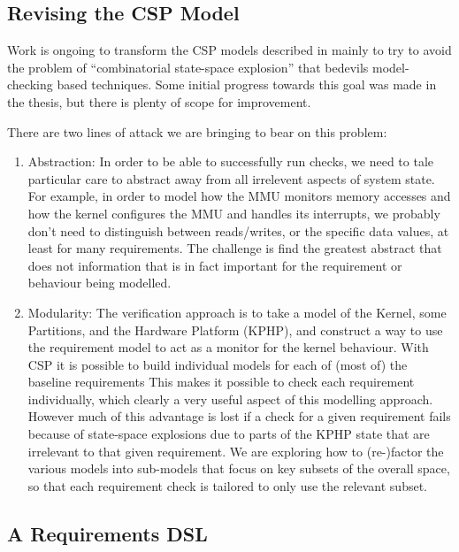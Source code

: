 \subsection{Revising the CSP Model}

Work is ongoing to transform the CSP models described in \cite{KH-MCS2016}
mainly to try to avoid the problem of ``combinatorial state-space explosion''
that bedevils model-checking based techniques.
Some initial progress towards this goal was made in the thesis,
but there is plenty of scope for improvement.

There are two lines of attack we are bringing to bear on this problem:
\begin{enumerate}
  \item Abstraction:
   In order to be able to successfully run checks,
   we need to tale particular care to abstract away from all irrelevent
   aspects of system state.
   For example, in order to model how the MMU monitors memory accesses
   and how the kernel configures the MMU and handles its interrupts,
   we probably don't need to distinguish between reads/writes,
   or the specific data values, at least for many requirements.
   The challenge is find the greatest abstract that does not information
   that is in fact important for the requirement or behaviour being modelled.
  \item Modularity:
    The verification approach is to take a model of the Kernel, some Partitions,
    and the Hardware Platform (KPHP),
    and construct a way to use the requirement model
    to act as a monitor for the kernel behaviour.
    With CSP it is possible to build individual models for each of (most of)
    the baseline requirements
    This makes it possible to check each requirement individually,
    which clearly a very useful aspect of this modelling approach.
    However much of this advantage is lost if a check for a given requirement
    fails because of state-space explosions
    due to parts of the KPHP state
    that are irrelevant to that given requirement.
    We are exploring how to (re-)factor the various models into sub-models
    that focus on key subsets of the overall space,
    so that each requirement check is tailored to only use the relevant subset.
\end{enumerate}

\subsection{A Requirements DSL}

